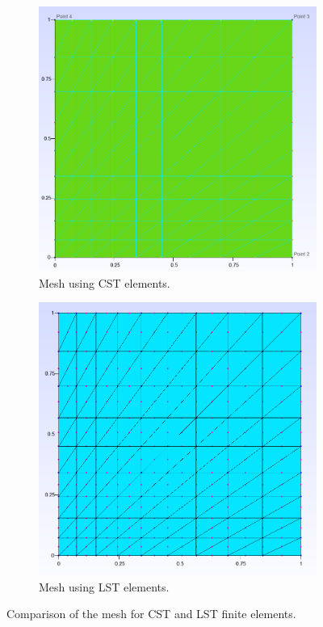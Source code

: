 \documentclass[12pt]{article}
\begin{document}
\begin{figure}[H]
    \centering
    \begin{subfigure}[t]{0.45\textwidth}
        \centering
        \includegraphics[width=\textwidth]{CST_mesh.png}
        \caption{Mesh using CST elements.}
        \label{fig:cst_mesh}
    \end{subfigure}
    \hfill
    \begin{subfigure}[t]{0.45\textwidth}
        \centering
        \includegraphics[width=\textwidth]{LST_mesh.png}
        \caption{Mesh using LST elements.}
        \label{fig:lst_mesh}
    \end{subfigure}
    \caption{Comparison of the mesh for CST and LST finite elements.}
    \label{fig:mesh_comparison}
\end{figure}
\end{document}
